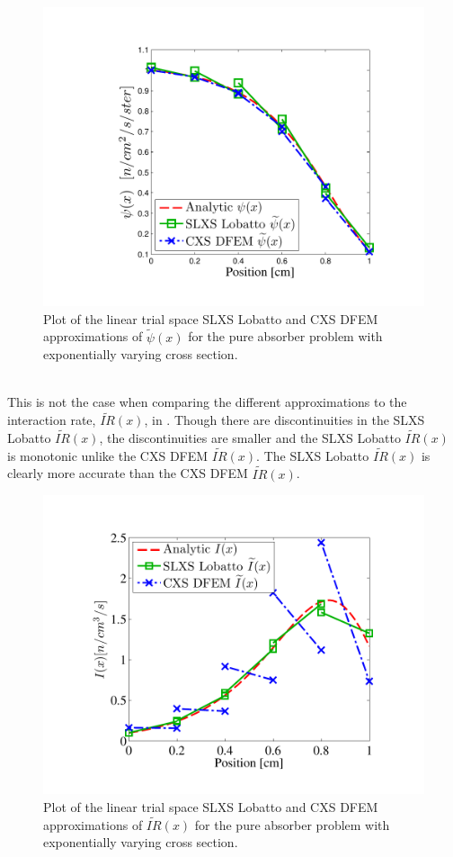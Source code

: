 \begin{figure}[!htp]
\centering
\includegraphics[width=12cm]{chapter3_variable_xs/SLXS_Psi_Profile.pdf}
\caption{Plot of the linear trial space SLXS Lobatto and CXS DFEM approximations of $\widetilde{\psi}(x)$ for the pure absorber problem with exponentially varying cross section.}
\label{fig:lobatto_blades_psi}
\end{figure}
%
\\
This is not the case when comparing the different approximations to the interaction rate, $\widetilde{IR}(x)$, in .  
Though there are discontinuities in the SLXS Lobatto $\widetilde{IR}(x)$, the discontinuities are smaller and the SLXS Lobatto $\widetilde{IR}(x)$ is monotonic unlike the CXS DFEM $\widetilde{IR}(x)$.   
The SLXS Lobatto $\widetilde{IR}(x)$ is clearly more accurate than the CXS DFEM $\widetilde{IR}(x)$.
%
\begin{figure}[!htp]
\centering
\includegraphics[width=12cm]{chapter3_variable_xs/SLXS_I_Profile.pdf}
\caption{Plot of the linear trial space SLXS Lobatto and CXS DFEM approximations of $\widetilde{IR}(x)$ for the pure absorber problem with exponentially varying cross section.}
\label{fig:lobatto_blades_ir}
\end{figure}
